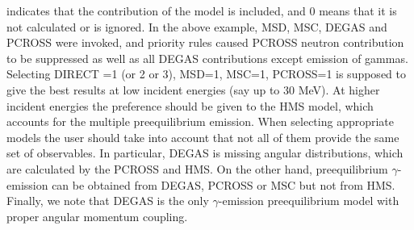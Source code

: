 \documentclass[twocolumn,amsmath,amssymb,10pt,groupedaddress,letter]{revtex4}
\begin{document}
 indicates that the contribution of the model is included,
and 0 means that it is not calculated or is ignored. In the above example,
MSD, MSC, DEGAS and PCROSS
were invoked, and priority rules caused PCROSS neutron contribution
to be suppressed as well as all DEGAS contributions except emission
of gammas.
Selecting DIRECT =1 (or 2 or 3), MSD=1, MSC=1, PCROSS=1 is supposed
to give the best results at low incident energies (say up to 30 MeV).
At higher incident energies the preference should be given to the
HMS model, which accounts for the multiple preequilibrium
emission. When selecting appropriate models the user should take into
account that not all of them provide the same set of observables.
In particular, DEGAS is missing angular distributions,
which are calculated by the PCROSS and HMS. On the other hand, preequilibrium
$\gamma$-emission can be obtained from DEGAS, PCROSS or MSC
but not from HMS. Finally, we note that DEGAS is the only $\gamma$-emission
preequilibrium model with proper angular momentum coupling.
\end{document}
